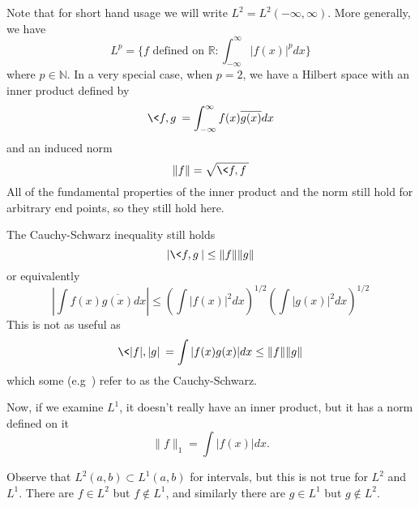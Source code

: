 
Note that for short hand usage we will write
$L^{2}=L^{2}(-\infty,\infty)$. More generally, we have
\begin{equation}
L^{p} = \{f\text{ defined on }\mathbb{R}:
\int^{\infty}_{-\infty}|f(x)|^pdx\}
\end{equation}
where $p\in\mathbb{N}$. In a very special case, when $p=2$,
we have a Hilbert space with an inner product defined by
\begin{equation}
\<f,g\> = \int^{\infty}_{-\infty}f(x)\overline{g(x)}dx
\end{equation}
and an induced norm
\begin{equation}
\|f\| = \sqrt{\<f,f\>}
\end{equation}
All of the fundamental properties of the inner product and
the norm still hold for arbitrary end points, so they still
hold here.

The Cauchy-Schwarz inequality still holds
\begin{equation}
|\<f,g\>|\leq\|f\|\|g\|
\end{equation}
or equivalently
\begin{equation}
|\int f(x)\overline{g(x)}dx|\leq\left(\int|f(x)|^2dx\right)^{1/2}\left(\int|g(x)|^2dx\right)^{1/2}
\end{equation}
This is not as useful as
\begin{equation}
\<|f|,|g|\>=\int|f(x)g(x)|dx\leq\|f\|\|g\|
\end{equation}
which some (e.g~\cite{textbook}) refer to as the Cauchy-Schwarz.

Now, if we examine $L^{1}$, it doesn't really have an inner
product, but it has a norm defined on it
\begin{equation}
\|f\|_{1} = \int|f(x)|dx.
\end{equation}

\begin{rmk}
Observe that $L^{2}(a,b)\subset L^{1}(a,b)$ for intervals,
but this is not true for $L^{2}$ and $L^{1}$. There are
$f\in L^2$ but $f\notin L^{1}$, and similarly there are
$g\in L^{1}$ but $g\notin L^{2}$.
\end{rmk}


